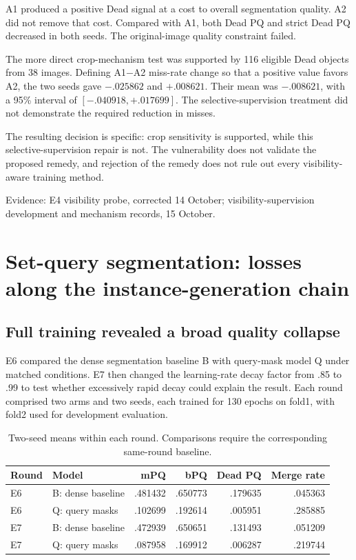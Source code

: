 \documentclass[11pt,a4paper]{article}
\newcommand{\src}[1]{\par{\footnotesize\color{gray}Evidence: #1}\par}
\begin{document}
A1 produced a positive Dead signal at a cost to overall segmentation quality. A2 did not remove that cost. Compared with A1, both Dead PQ and strict Dead PQ decreased in both seeds. The original-image quality constraint failed.

The more direct crop-mechanism test was supported by 116 eligible Dead objects from 38 images. Defining A1$-$A2 miss-rate change so that a positive value favors A2, the two seeds gave $-.025862$ and $+.008621$. Their mean was $-.008621$, with a 95\% interval of $[-.040918,+.017699]$. The selective-supervision treatment did not demonstrate the required reduction in misses.

The resulting decision is specific: crop sensitivity is supported, while this selective-supervision repair is not. The vulnerability does not validate the proposed remedy, and rejection of the remedy does not rule out every visibility-aware training method.

\src{E4 visibility probe, corrected 14 October; visibility-supervision development and mechanism records, 15 October.}

\section{Set-query segmentation: losses along the instance-generation chain}

\subsection{Full training revealed a broad quality collapse}

E6 compared the dense segmentation baseline B with query-mask model Q under matched conditions. E7 then changed the learning-rate decay factor from .85 to .99 to test whether excessively rapid decay could explain the result. Each round comprised two arms and two seeds, each trained for 130 epochs on fold1, with fold2 used for development evaluation.

\begin{table}[H]\centering\small
\begin{tabular}{llrrrr}\toprule
Round & Model & mPQ & bPQ & Dead PQ & Merge rate\\\midrule
E6 & B: dense baseline & .481432 & .650773 & .179635 & .045363\\
E6 & Q: query masks & .102699 & .192614 & .005951 & .285885\\
E7 & B: dense baseline & .472939 & .650651 & .131493 & .051209\\
E7 & Q: query masks & .087958 & .169912 & .006287 & .219744\\\bottomrule
\end{tabular}
\caption{Two-seed means within each round. Comparisons require the corresponding same-round baseline.}
\end{table}
\end{document}

